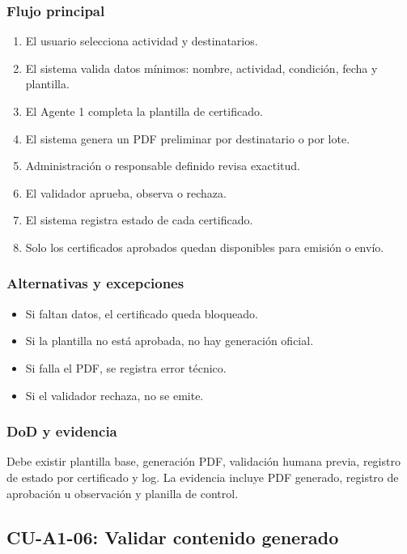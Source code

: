 \documentclass[11pt,a4paper]{article}
\begin{document}
\subsubsection{Flujo principal}

\begin{enumerate}
  \item El usuario selecciona actividad y destinatarios.
  \item El sistema valida datos mínimos: nombre, actividad, condición, fecha y plantilla.
  \item El Agente 1 completa la plantilla de certificado.
  \item El sistema genera un PDF preliminar por destinatario o por lote.
  \item Administración o responsable definido revisa exactitud.
  \item El validador aprueba, observa o rechaza.
  \item El sistema registra estado de cada certificado.
  \item Solo los certificados aprobados quedan disponibles para emisión o envío.
\end{enumerate}

\subsubsection{Alternativas y excepciones}

\begin{itemize}
  \item Si faltan datos, el certificado queda bloqueado.
  \item Si la plantilla no está aprobada, no hay generación oficial.
  \item Si falla el PDF, se registra error técnico.
  \item Si el validador rechaza, no se emite.
\end{itemize}

\subsubsection{DoD y evidencia}

Debe existir plantilla base, generación PDF, validación humana previa, registro de estado por certificado y log. La evidencia incluye PDF generado, registro de aprobación u observación y planilla de control.

\subsection{CU-A1-06: Validar contenido generado}
\end{document}
